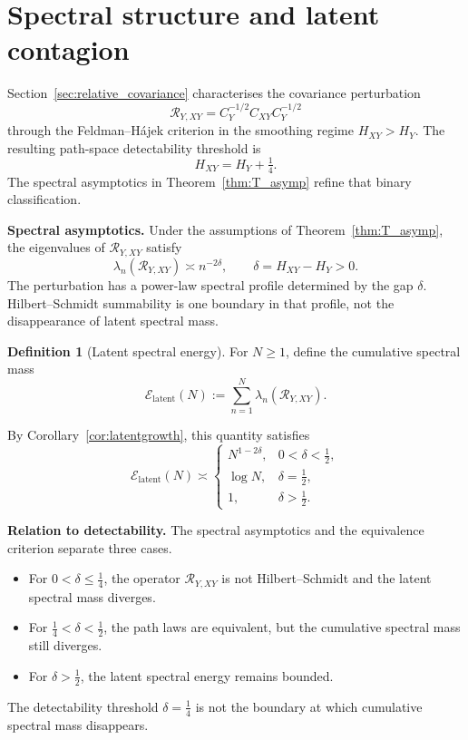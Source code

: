 \documentclass[11pt,a4paper]{amsart}
\theoremstyle{plain}
\theoremstyle{definition}
\newtheorem{definition}[theorem]{Definition}
\theoremstyle{remark}
\begin{document}
\section{Spectral structure and latent contagion}\label{sec:latent_forcing}

Section~\ref{sec:relative_covariance} characterises the covariance perturbation
\[
\mathcal R_{Y,XY} = C_Y^{-1/2} C_{XY} C_Y^{-1/2}
\]
through the Feldman--H\'ajek criterion in the smoothing regime $H_{XY}>H_Y$.  The resulting
path-space detectability threshold is
\[
H_{XY}=H_Y+\tfrac14.
\]
The spectral asymptotics in Theorem~\ref{thm:T_asymp} refine that binary classification.

\medskip

\noindent
\textbf{Spectral asymptotics.}
Under the assumptions of Theorem~\ref{thm:T_asymp}, the eigenvalues of
\(\mathcal R_{Y,XY}\) satisfy
\[
\lambda_n(\mathcal R_{Y,XY})\asymp n^{-2\delta},
\qquad
\delta = H_{XY}-H_Y > 0.
\]
The perturbation has a power-law spectral profile determined by the gap $\delta$.
Hilbert--Schmidt summability is one boundary in that profile, not the disappearance of latent
spectral mass.

\medskip

\begin{definition}[Latent spectral energy]
For $N\ge1$, define the cumulative spectral mass
\[
\mathcal E_{\mathrm{latent}}(N)
:=
\sum_{n=1}^N \lambda_n(\mathcal R_{Y,XY}).
\]
\end{definition}

By Corollary~\ref{cor:latentgrowth}, this quantity satisfies
\[
\mathcal E_{\mathrm{latent}}(N)\asymp
\begin{cases}
N^{1-2\delta}, & 0<\delta<\tfrac12,\\
\log N, & \delta=\tfrac12,\\
1, & \delta>\tfrac12.
\end{cases}
\]

\medskip

\noindent
\textbf{Relation to detectability.}
The spectral asymptotics and the equivalence criterion separate three cases.
\begin{itemize}
\item For \(0<\delta\le\tfrac14\), the operator \(\mathcal R_{Y,XY}\) is not Hilbert--Schmidt and the latent spectral mass diverges.
\item For $\tfrac14<\delta<\tfrac12$, the path laws are equivalent, but the cumulative spectral mass still diverges.
\item For $\delta>\tfrac12$, the latent spectral energy remains bounded.
\end{itemize}
The detectability threshold $\delta=\tfrac14$ is not the boundary at which cumulative spectral mass
disappears.
\end{document}
